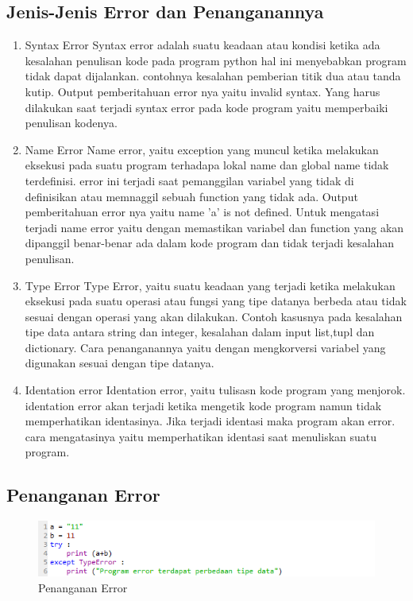 \subsection{Jenis-Jenis Error dan Penanganannya}
\begin{enumerate}
    \item Syntax Error
    Syntax error adalah suatu keadaan atau kondisi ketika ada kesalahan penulisan kode pada program python hal ini menyebabkan program tidak dapat dijalankan. contohnya kesalahan pemberian titik dua atau tanda kutip. Output pemberitahuan error nya yaitu invalid syntax. Yang harus dilakukan saat terjadi syntax error pada kode program yaitu memperbaiki penulisan kodenya.
    \item Name Error
    Name error, yaitu exception yang muncul ketika melakukan eksekusi pada suatu program terhadapa lokal name dan global name tidak terdefinisi. error ini terjadi saat pemanggilan variabel yang tidak di definisikan atau memnaggil sebuah function yang tidak ada. Output pemberitahuan error nya yaitu name 'a' is not defined. Untuk mengatasi terjadi name error yaitu dengan memastikan variabel dan function yang akan dipanggil benar-benar ada dalam kode program dan tidak terjadi kesalahan penulisan.
    \item Type Error
    Type Error, yaitu suatu keadaan yang terjadi ketika melakukan eksekusi pada suatu operasi atau fungsi yang tipe datanya berbeda atau tidak sesuai dengan operasi yang akan dilakukan. Contoh kasusnya pada kesalahan tipe data antara string dan integer, kesalahan dalam input list,tupl dan dictionary. Cara penanganannya yaitu dengan mengkorversi variabel yang digunakan sesuai dengan tipe datanya.
    \item Identation error
    Identation error, yaitu tulisasn kode program yang menjorok. identation error akan terjadi ketika mengetik kode program namun tidak memperhatikan identasinya. Jika terjadi identasi maka program akan error. cara mengatasinya yaitu memperhatikan identasi saat menuliskan suatu program.
\end{enumerate}
\subsection{Penanganan Error}
     \begin{figure}[!htbp]
        \centering
        \includegraphics[width=15cm]{figures/jwb12.PNG}
        \caption{Penanganan Error}
    \end{figure}
